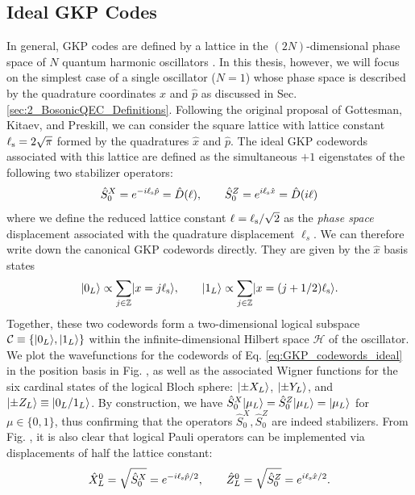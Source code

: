 \subsection{Ideal GKP Codes}
In general, GKP codes are defined by a lattice in the $(2N)$-dimensional phase space of $N$ quantum harmonic oscillators \cite{gottesman2001gkp, royer2022multimodegkp}. In this thesis, however, we will focus on the simplest case of a single oscillator ($N=1$) whose phase space is described by the quadrature coordinates $\hat{x}$ and $\hat{p}$ as discussed in Sec. \ref{sec:2_BosonicQEC_Definitions}. Following the original proposal of Gottesman, Kitaev, and Preskill, we can consider the square lattice with lattice constant $\ell_{\rm s} = 2\sqrt{\pi}$ formed by the quadratures $\hat{x}$ and $\hat{p}$. The ideal GKP codewords associated with this lattice are defined as the simultaneous $+1$ eigenstates of the following two stabilizer operators: 
\begin{equation}
    \hat{S}_0^X = e^{-i\ell_{\rm s}\hat{p}} = \hat{D}(\ell) , \qquad \hat{S}_0^Z = e^{i\ell_{\rm s}\hat{x}} = \hat{D}(i\ell)
\end{equation}
where we define the reduced lattice constant $\ell = \ell_{\rm s}/\sqrt{2}$ as the \textit{phase space} displacement associated with the quadrature displacement $\ell_s$. We can therefore write down the canonical GKP codewords directly. They are given by the $\hat{x}$ basis states
\begin{equation}
    \lvert0_L\rangle \propto \sum_{j \in \mathbb{Z}} \lvert x = j\ell_{\rm s}\rangle, \qquad \lvert1_L\rangle \propto \sum_{j \in \mathbb{Z}} \lvert x = (j + 1/2)\ell_{\rm s}\rangle.
    \label{eq:GKP_codewords_ideal}
\end{equation}
Together, these two codewords form a two-dimensional logical subspace $\mathcal{C} \equiv \{\lvert0_L\rangle, \lvert1_L\rangle\}$ within the infinite-dimensional Hilbert space $\mathcal{H}$ of the oscillator. We plot the wavefunctions for the codewords of Eq. \eqref{eq:GKP_codewords_ideal} in the position basis in Fig. , as well as the associated Wigner functions for the six cardinal states of the logical Bloch sphere: $\lvert\pm X_L\rangle$, $\lvert\pm Y_L\rangle$, and $\lvert\pm Z_L\rangle \equiv \lvert0_L/1_L\rangle$. By construction, we have $\hat{S}_0^X\lvert\mu_L\rangle = \hat{S}_0^Z\lvert\mu_L\rangle = \lvert\mu_L\rangle$ for $\mu\in\{0, 1\}$, thus confirming that the operators $\hat{S}_0^X, \hat{S}_0^Z$ are indeed stabilizers. From Fig. , it is also clear that logical Pauli operators can be implemented via displacements of half the lattice constant: 
\begin{equation}
    \hat{X}_L^0 = \sqrt{\hat{S}_0^X} =  e^{-i\ell_{\rm s}\hat{p}/2} , \qquad \hat{Z}_L^0 = \sqrt{\hat{S}_0^Z} = e^{i\ell_{\rm s}\hat{x}/2}. 
\end{equation}


